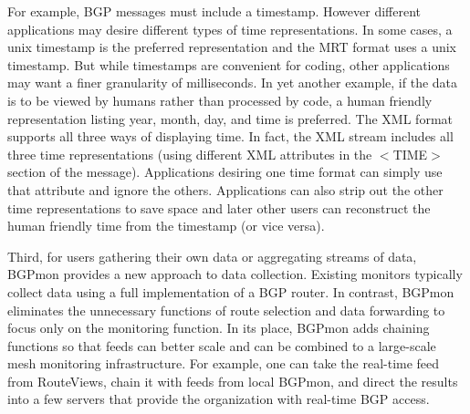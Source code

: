 For example,   BGP messages must include a timestamp.   However different applications may desire different types of time representations.   In some cases, a unix timestamp is the preferred representation and the MRT format uses a unix timestamp.    But while timestamps are convenient for coding,  other applications may want a finer granularity of milliseconds.   In yet another example, if the data is to be viewed by humans rather than processed by code,   a human friendly representation listing year, month, day, and time is preferred.    The XML format supports all three ways of displaying time.     In fact, the XML stream includes all three time representations (using different XML attributes in the $<$TIME$>$ section of the message).    Applications desiring one time format can simply use that attribute and ignore the others.   Applications can also strip out the other time representations to save space and later other users can reconstruct the human friendly time from the timestamp (or vice versa).

Third,  for users gathering their own data or aggregating streams of data,  BGPmon provides a new approach to data collection.  Existing monitors typically collect data using a full implementation of a BGP router.   In contrast, BGPmon eliminates the unnecessary functions of route selection and data forwarding to focus only on the monitoring function.  In its place, BGPmon adds chaining functions so that feeds can better scale and can be combined to a large-scale mesh monitoring infrastructure.    For example,   one can take the real-time feed from RouteViews, chain it with feeds from local BGPmon,  and direct the results into a few servers that provide the organization with real-time BGP access.
